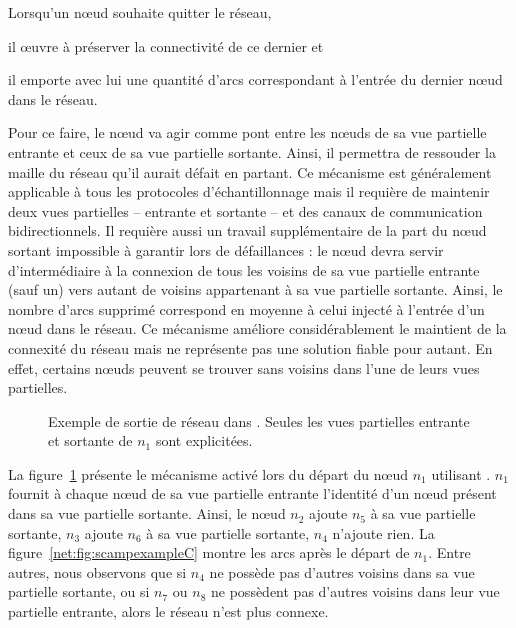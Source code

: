 \noindent Lorsqu'un nœud souhaite quitter le réseau,
\begin{inparaenum}[(i)]
\item il œuvre à préserver la connectivité de ce dernier et
\item il emporte avec lui une quantité d'arcs correspondant à l'entrée du
  dernier nœud dans le réseau.
\end{inparaenum}
Pour ce faire, le nœud va agir comme pont entre les nœuds de sa vue partielle
entrante et ceux de sa vue partielle sortante. Ainsi, il permettra de ressouder
la maille du réseau qu'il aurait défait en partant. Ce mécanisme est
généralement applicable à tous les protocoles d'échantillonnage mais il requière
de maintenir deux vues partielles -- entrante et sortante -- et des canaux de
communication bidirectionnels. Il requière aussi un travail supplémentaire de la
part du nœud sortant impossible à garantir lors de défaillances : le nœud devra
servir d'intermédiaire à la connexion de tous les voisins de sa vue partielle
entrante (sauf un) vers autant de voisins appartenant à sa vue partielle
sortante. Ainsi, le nombre d'arcs supprimé correspond en moyenne à celui injecté
à l'entrée d'un nœud dans le réseau. Ce mécanisme améliore considérablement le
maintient de la connexité du réseau mais ne représente pas une solution fiable
pour autant. En effet, certains nœuds peuvent se trouver sans voisins dans l'une
de leurs vues partielles.
  

\begin{figure}
  \centering
  \hspace{45pt}
  \caption[Protocole de sortie dans \SCAMP]
  {\label{net:fig:scampexample2} Exemple de sortie de réseau dans \SCAMP. Seules
    les vues partielles entrante et sortante de $n_1$ sont explicitées.}
\end{figure}

\noindent La figure~\ref{net:fig:scampexample2} présente le mécanisme activé
lors du départ du nœud $n_1$ utilisant \SCAMP. $n_1$ fournit à chaque nœud de sa
vue partielle entrante l'identité d'un nœud présent dans sa vue partielle
sortante. Ainsi, le nœud $n_2$ ajoute $n_5$ à sa vue partielle sortante, $n_3$
ajoute $n_6$ à sa vue partielle sortante, $n_4$ n'ajoute rien. La
figure~\ref{net:fig:scampexampleC} montre les arcs après le départ de
$n_1$. Entre autres, nous observons que si $n_4$ ne possède pas d'autres voisins
dans sa vue partielle sortante, ou si $n_7$ ou $n_8$ ne possèdent pas d'autres
voisins dans leur vue partielle entrante, alors le réseau n'est plus connexe.

